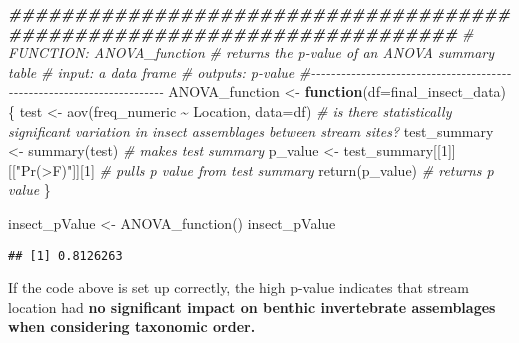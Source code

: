 \documentclass[
]{article}
\newenvironment{Shaded}{\begin{snugshade}}{\end{snugshade}}
\newcommand{\AttributeTok}[1]{\textcolor[rgb]{0.77,0.63,0.00}{#1}}
\newcommand{\CommentTok}[1]{\textcolor[rgb]{0.56,0.35,0.01}{\textit{#1}}}
\newcommand{\ControlFlowTok}[1]{\textcolor[rgb]{0.13,0.29,0.53}{\textbf{#1}}}
\newcommand{\DecValTok}[1]{\textcolor[rgb]{0.00,0.00,0.81}{#1}}
\newcommand{\DocumentationTok}[1]{\textcolor[rgb]{0.56,0.35,0.01}{\textbf{\textit{#1}}}}
\newcommand{\FunctionTok}[1]{\textcolor[rgb]{0.00,0.00,0.00}{#1}}
\newcommand{\NormalTok}[1]{#1}
\newcommand{\OtherTok}[1]{\textcolor[rgb]{0.56,0.35,0.01}{#1}}
\newcommand{\SpecialCharTok}[1]{\textcolor[rgb]{0.00,0.00,0.00}{#1}}
\newcommand{\StringTok}[1]{\textcolor[rgb]{0.31,0.60,0.02}{#1}}
\begin{document}
\begin{Shaded}
\begin{Highlighting}[]
\DocumentationTok{\#\#\#\#\#\#\#\#\#\#\#\#\#\#\#\#\#\#\#\#\#\#\#\#\#\#\#\#\#\#\#\#\#\#\#\#\#\#\#\#\#\#\#\#\#\#\#\#\#\#\#\#\#\#\#\#\#\#\#\#\#\#\#\#\#\#\#\#\#\#\#\#}
\CommentTok{\# FUNCTION: ANOVA\_function}
\CommentTok{\# returns the p{-}value of an ANOVA summary table}
\CommentTok{\# input: a data frame}
\CommentTok{\# outputs: p{-}value}
\CommentTok{\#{-}{-}{-}{-}{-}{-}{-}{-}{-}{-}{-}{-}{-}{-}{-}{-}{-}{-}{-}{-}{-}{-}{-}{-}{-}{-}{-}{-}{-}{-}{-}{-}{-}{-}{-}{-}{-}{-}{-}{-}{-}{-}{-}{-}{-}{-}{-}{-}{-}{-}{-}{-}{-}{-}{-}{-}{-}{-}{-}{-}{-}{-}{-}{-}{-}{-}{-}{-}{-}{-}{-}}
\NormalTok{ANOVA\_function }\OtherTok{\textless{}{-}} \ControlFlowTok{function}\NormalTok{(}\AttributeTok{df=}\NormalTok{final\_insect\_data)\{}
\NormalTok{  test }\OtherTok{\textless{}{-}} \FunctionTok{aov}\NormalTok{(freq\_numeric }\SpecialCharTok{\textasciitilde{}}\NormalTok{ Location, }\AttributeTok{data=}\NormalTok{df)  }\CommentTok{\# is there statistically significant variation in insect assemblages between stream sites?}
\NormalTok{  test\_summary }\OtherTok{\textless{}{-}} \FunctionTok{summary}\NormalTok{(test)  }\CommentTok{\# makes test summary}
\NormalTok{  p\_value }\OtherTok{\textless{}{-}}\NormalTok{ test\_summary[[}\DecValTok{1}\NormalTok{]][[}\StringTok{"Pr(\textgreater{}F)"}\NormalTok{]][}\DecValTok{1}\NormalTok{]  }\CommentTok{\# pulls p value from test summary}
  \FunctionTok{return}\NormalTok{(p\_value)  }\CommentTok{\# returns p value}
\NormalTok{\}}

\NormalTok{insect\_pValue }\OtherTok{\textless{}{-}} \FunctionTok{ANOVA\_function}\NormalTok{()}
\NormalTok{insect\_pValue}
\end{Highlighting}
\end{Shaded}

\begin{verbatim}
## [1] 0.8126263
\end{verbatim}

If the code above is set up correctly, the high p-value indicates that
stream location had \textbf{no significant impact on benthic
invertebrate assemblages when considering taxonomic order.}
\end{document}
